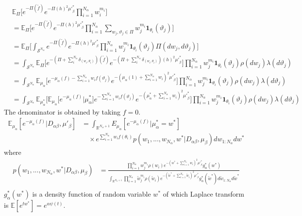\documentclass{article}
\begin{document}
\begin{align}
&\mathbb{E}_{\Pi}\Big[e^{-\Pi(\tilde{f})} e^{-\Pi(h)^2{\mu'}_\beta^{*}} \prod_{i=1}^{N_\alpha} w_i^{m_i} \Big] &\\
&= \mathbb{E}_{\Pi}\Big[e^{-\Pi(\tilde{f})} e^{-\Pi(h)^2{\mu'}_\beta^{*}} \prod_{i=1}^{N_\alpha} \sum_{w_j, \vartheta_j \in \Pi} w_j^{m_i} \mathbf{1}_{\theta_i}(\vartheta_j)\Big]& \\
&= \mathbb{E}_{\Pi}\Big[\int_{\mathcal{S}^{N_\alpha}} e^{-\Pi(\tilde{f})} e^{-\Pi(h)^2{\mu'}_\beta^{*}}  \prod_{i=1}^{N_\alpha} w_j^{m_i} \mathbf{1}_{\theta_i}(\vartheta_j) \Pi(dw_j, d\vartheta_j)\Big]& \\
&=  \int_{\mathcal{S}^{N_\alpha}} \mathbb{E}_{\Pi}\Big[ e^{-(\Pi+\sum_i^{N_\alpha}\delta_{(w_i, \theta_i)})(\tilde{f})} e^{-(\Pi+\sum_i^{N_\alpha}\delta_{(w_i, \theta_i)})(h)^2{\mu'}_\beta^{*}}\Big] \prod_{i=1}^{N_\alpha} w_j^{m_i} \mathbf{1}_{\theta_i}(\vartheta_j) \rho(dw_j)\lambda(d\vartheta_j) & \\
&=  \int_{\mathcal{S}^{N_\alpha}} \mathbb{E}_{\mu_\alpha}\Big[ e^{-\mu_\alpha(f) - \sum_{i=1}^{N_\alpha}w_if(\vartheta_j)} e^{-(\mu_\alpha(1) + \sum_{i=1}^{N_\alpha} w_i)^2{\mu'}_\beta^{*}}\Big] \prod_{i=1}^{N_\alpha} w_j^{m_i} \mathbf{1}_{\theta_i}(\vartheta_j) \rho(dw_j)\lambda(d\vartheta_j) &\\
&=  \int_{\mathcal{S}^{N_\alpha}} \mathbb{E}_{\mu_\alpha^*}\bigg[ \mathbb{E}_{\mu_\alpha} \Big[e^{-\mu_\alpha(f)}|\mu_\alpha^* \Big] e^{- \sum_{i=1}^{N_\alpha}w_if(\vartheta_j)} e^{-(\mu_\alpha^* + \sum_{i=1}^{N_\alpha} w_i)^2{\mu'}_\beta^{*}}\bigg] \prod_{i=1}^{N_\alpha} w_j^{m_i} \mathbf{1}_{\theta_i}(\vartheta_j) \rho(dw_j)\lambda(d\vartheta_j) &
\end{align}
The denominator is obtained by taking $f=0$.
\begin{align}
\mathbb{E}_{\mu_\alpha}[e^{-\mu_\alpha(f)}|D_{\alpha\beta}, \mu'_\beta] &= \int_{\mathbb{R}^{N_\alpha + 1}} E_{\mu_\alpha}[e^{-\mu_\alpha(f)}|\mu_\alpha^* = w^*]\\
&\quad \times e^{\sum_{i=1}^{N_\alpha}w_i f(\theta_i)} p(w_1, ..., w_{N_\alpha}, w^*|D_{\alpha\beta}, \mu_\beta) dw_{1:N_\alpha}dw^*
\end{align}
where
\begin{align}
p(w_1, ..., w_{N_\alpha}, w^*|D_{\alpha\beta}, \mu_\beta)&
= \frac{\prod_{i=1}^{N_\alpha} w_j^{m_i} \rho(w_i) e^{-(w^* + \sum_{i=1}^{N_\alpha} w_i)^2{\mu'}_\beta^{*}} g^*_\alpha(w^*)}
{\int_{\mathbb{R}^{N_\alpha + 1}}\prod_{i=1}^{N_\alpha} \tilde{w}_j^{m_i} \rho(\tilde{w}_i) e^{-(\tilde{w}^* + \sum_{i=1}^{N_\alpha} \tilde{w}_i)^2{\mu'}_\beta^{*}} g^*_\alpha(\tilde{w}^*) d\tilde{w}_{1:N_\alpha}d\tilde{w}^*}\\
\end{align}
$g^*_\alpha(w^*)$ is a density function of random variable $w^*$ of which Laplace transform is $\mathbb{E}[e^{tw^*}] = e^{\alpha\psi(t)}$.



\end{document}
